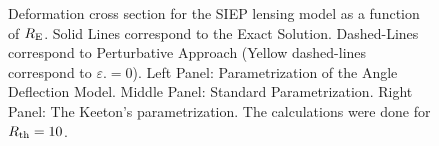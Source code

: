 \begin{figure}[!ht]
{}
\caption{\label{dcs_siep_re_pm} Deformation cross section for the  SIEP lensing
model as a function of $R_{\rm E}$. Solid Lines correspond to the Exact
Solution. Dashed-Lines correspond to Perturbative Approach (Yellow dashed-lines 
correspond to $\varepsilon.=0$). Left Panel:
Parametrization of the Angle Deflection Model. Middle Panel: Standard
Parametrization. Right Panel: The Keeton's parametrization.  The calculations
were done for $R_{\rm th}=10$.}
\end{figure}

